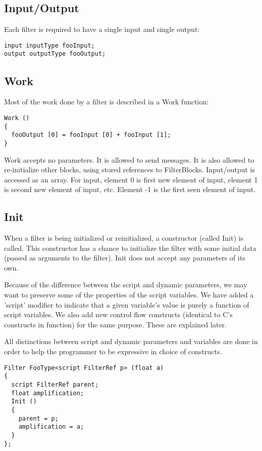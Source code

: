 \documentclass[twocolumn, draft]{article}
\begin{document}
\subsection{Input/Output}

Each filter is required to have a single input and single output:
\begin{verbatim}
input inputType fooInput;
output outputType fooOutput;
\end{verbatim}

\subsection{Work}

Most of the work done by a filter is described in a Work function:

\begin{verbatim}
Work ()
{
  fooOutput [0] = fooInput [0] + fooInput [1];
}
\end{verbatim}

Work accepts no parameters.  It is allowed to send messages.  It is also
allowed to re-initialize other blocks, using stored references to
FilterBlocks.
Input/output
is accessed as an array.  For input, element 0 is first new element of input,
element 1 is second new element of input, etc.  Element -1 is the first seen
element of input.

\subsection{Init}

When a filter is being initialized or reinitialized, a constructor 
(called Init) is called.  This constructor has a chance to initialize 
the filter with some initial data (passed as arguments to the filter).
Init does not accept any parameters of its own.

Because of the difference between the script and dynamic parameters,
we may want to preserve some of the properties of the script variables.
We have added a 'script' modifier to indicate that a given variable's
value is purely a function of script variables.  We also add new control
flow constructs (identical to C's constructs in function) for the same purpose.
These are explained later.

All distinctions between script and dynamic parameters and variables
are done in order to help the programmer to be expressive in choice of
constructs.

\begin{verbatim}
Filter FooType<script FilterRef p> (float a)
{
  script FilterRef parent;
  float amplification;
  Init ()
  {
    parent = p;
    amplification = a;
  }
};
\end{verbatim}
\end{document}

